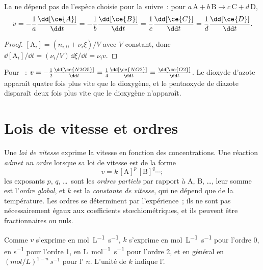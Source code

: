 \begin{proposition}\label{prop:b1:rate-laws:rate-relations}
La  ne dépend pas de l'espèce choisie pour la suivre~:
pour $a\,\mathrm{A} + b\,\mathrm{B} \longrightarrow c\,\mathrm{C} + d\,\mathrm{D}$,
\[
  v = -\frac1a\frac{\dd[\ce{A}]}{\dd t} = -\frac1b\frac{\dd[\ce{B}]}{\dd t}
  = \frac1c\frac{\dd[\ce{C}]}{\dd t} = \frac1d\frac{\dd[\ce{D}]}{\dd t} .
\]
\end{proposition}

\begin{proof}
$[\mathrm{A}_i] = (n_{i,0} + \nu_i\xi)/V$ avec $V$ constant, donc
$\dd[\mathrm{A}_i]/\dd t = (\nu_i/V)\,\dd\xi/\dd t = \nu_i v$.
\end{proof}

\begin{example}\label{ex:b1:rate-laws:n2o5}
Pour ~: $v = -\frac12\frac{\dd[\ce{N2O5}]}{\dd t} =
\frac14\frac{\dd[\ce{NO2}]}{\dd t} = \frac{\dd[\ce{O2}]}{\dd t}$. Le
dioxyde d'azote apparaît quatre fois plus vite que le dioxygène, et le
pentaoxyde de diazote disparaît deux fois plus vite que le dioxygène
n'apparaît.
\end{example}

\section{Lois de vitesse et ordres}

\begin{definition}\label{def:b1:rate-laws:order}
Une \emph{loi de vitesse} exprime la vitesse en fonction des
concentrations. Une réaction \emph{admet un ordre} lorsque sa loi de
vitesse est de la forme
\[
  v = k\,[\mathrm{A}]^{p}\,[\mathrm{B}]^{q} \cdots ;
\]
les exposants $p$, $q$, \dots\ sont les \emph{ordres partiels}
par rapport à A, B, \dots, leur somme est l'\emph{ordre
global}, et $k$ est la \emph{constante de vitesse},
qui ne dépend que de la température. Les ordres se déterminent par
l'expérience~; ils ne sont pas nécessairement égaux aux coefficients
stœchiométriques, et ils peuvent être fractionnaires ou nuls.
\end{definition}

\begin{remark}[Unités de $k$]\label{rem:b1:rate-laws:units}
Comme $v$ s'exprime en \unit{mol.L^{-1}.s^{-1}}, $k$ s'exprime en
\unit{mol.L^{-1}.s^{-1}} pour l'ordre 0, en \unit{s^{-1}} pour l'ordre 1,
en \unit{L.mol^{-1}.s^{-1}} pour l'ordre 2, et en général en
$(\unit{mol/L})^{1-n}\,\unit{s^{-1}}$ pour l' $n$. L'unité
de $k$ indique l'.
\end{remark}

